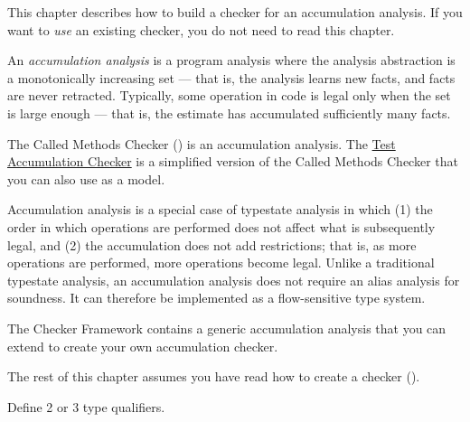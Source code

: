 \htmlhr
{}


This chapter describes how to build a checker for an accumulation analysis.
If you want to \emph{use} an existing checker, you do not need to read this chapter.

An \emph{accumulation analysis} is a program analysis where the
analysis abstraction is a monotonically increasing set --- that is, the
analysis learns new facts, and facts are never retracted.
Typically, some operation in code is legal
only when the set is large enough --- that is, the estimate has accumulated
sufficiently many facts.

The Called Methods Checker ()
is an accumulation analysis.
The
\href{https://github.com/typetools/checker-framework/blob/master/framework/src/test/java/testaccumulation/TestAccumulationChecker.java}{Test Accumulation Checker}
is a simplified version of the Called Methods Checker that you can also use as a model.

Accumulation analysis is a special case of typestate analysis in which
(1) the order in which operations are performed does not affect what is subsequently legal,
and (2) the accumulation does not add restrictions; that is, as
more operations are performed, more operations become legal.
Unlike a traditional typestate analysis, an accumulation analysis does
not require an alias analysis for soundness. It can therefore be implemented
as a flow-sensitive type system.

The Checker Framework contains a generic accumulation analysis that you can
extend to create your own accumulation checker.

The rest of this chapter assumes you have read how to create a checker
().


Define 2 or 3 type qualifiers.

